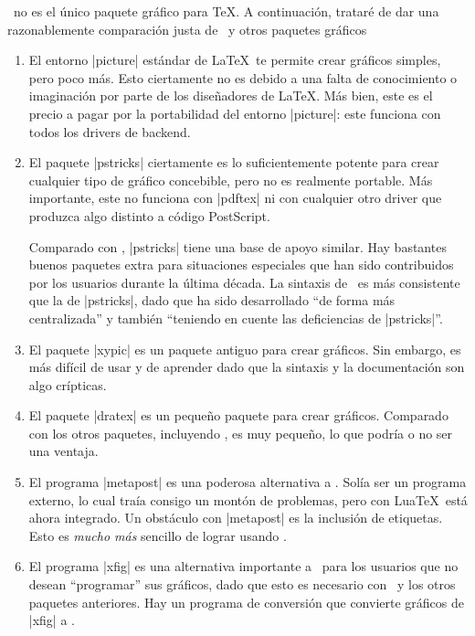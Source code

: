 \tikzname\ no es el único paquete gráfico para \TeX. A continuación, trataré de
dar una razonablemente comparación justa de \tikzname\ y otros paquetes gráficos
%
\begin{enumerate}
    \item El entorno |{picture}| estándar de \LaTeX\ te permite crear gráficos
    simples, pero poco más. Esto ciertamente no es debido a una falta de
    conocimiento o imaginación por parte de los diseñadores de \LaTeX. Más bien,
    este es el precio a pagar por la portabilidad del entorno |{picture}|: este
    funciona con todos los drivers de backend.
    
    \item El paquete |{pstricks}| ciertamente es lo suficientemente potente para
    crear cualquier tipo de gráfico concebible, pero no es realmente portable.
    Más importante, este no funciona con |pdftex| ni con cualquier otro driver
    que produzca algo distinto a código PostScript.

    Comparado con \tikzname, |pstricks| tiene una base de apoyo similar. Hay
    bastantes buenos paquetes extra para situaciones especiales que han sido
    contribuidos por los usuarios durante la última década. La sintaxis de
    \tikzname\ es más consistente que la de |pstricks|, dado que \tikzname ha
    sido desarrollado ``de forma más centralizada'' y también ``teniendo en
    cuente las deficiencias de |pstricks|''.

    \item El paquete |xypic| es un paquete antiguo para crear gráficos. Sin
    embargo, es más difícil de usar y de aprender dado que la sintaxis y la
    documentación son algo crípticas.

    \item El paquete |dratex| es un pequeño paquete para crear gráficos.
    Comparado con los otros paquetes, incluyendo \tikzname, es muy pequeño, lo
    que podría o no ser una ventaja.

    \item El programa |metapost| es una poderosa alternativa a \tikzname. Solía
    ser un programa externo, lo cual traía consigo un montón de problemas, pero
    con Lua\TeX\ está ahora integrado. Un obstáculo con |metapost| es la
    inclusión de etiquetas. Esto es \emph{mucho más} sencillo de lograr usando
    \pgfname.

    \item El programa |xfig| es una alternativa importante a \tikzname\ para los
    usuarios que no desean ``programar'' sus gráficos, dado que esto es
    necesario con \tikzname\ y los otros paquetes anteriores. Hay un programa
    de conversión que convierte gráficos de |xfig| a \tikzname.
\end{enumerate}


